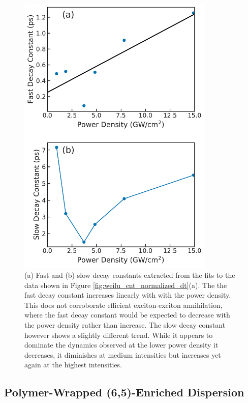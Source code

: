 \begin{figure}[ht]
	\centering
	\includegraphics[height=5.4in]{images/chapter_my_data/Weilu_CNT_Fast_Slow_Decay_Const}
	\caption{(a) Fast and (b) slow decay constants extracted from the fits to the data shown in Figure \ref{fig:weilu_cnt_normalized_dt}(a). The the fast decay constant increases linearly with with the power density. This does not corroborate efficient exciton-exciton annihilation, where the fast decay constant would be expected to decrease with the power density rather than increase. The slow decay constant however shows a slightly different trend. While it appears to dominate the dynamics observed at the lower power density it decreases, it diminishes at medium intensities but increases yet again at the highest intensities.}
	\label{fig:weilu_cnt_decay_const}
\end{figure}


\clearpage
\subsection{Polymer-Wrapped (6,5)-Enriched Dispersion}



